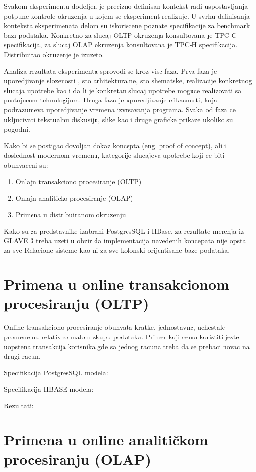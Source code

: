 \documentclass[12pt,oneside]{memoir}
\begin{document}
Svakom eksperimentu dodeljen je precizno definisan kontekst radi uspostavljanja potpune kontrole okruzenja u kojem se eksperiment realizuje. U svrhu definisanja konteksta eksperimenata delom su iskoriscene poznate specifikacije za benchmark bazi podataka. Konkretno za slucaj OLTP okruzenja konsultovana je TPC-C specifikacija, za slucaj OLAP okruzenja konsultovana je TPC-H specifikacija. Distribuirao okruzenje je izuzeto.

Analiza rezultata eksperimenta sprovodi se kroz vise faza. Prva faza je uporedjivanje slozenosti , sto arhitekturalne, sto shematske, realizacije konkretnog slucaja upotrebe kao i da li je konkretan slucaj upotrebe moguce realizovati sa postojecom tehnologijom. Druga faza je uporedjivanje efikasnosti, koja podrazumeva uporedjivanje vremena izvrsavanja programa.  Svaka od faza ce ukljucivati tekstualnu diskusiju, slike kao i druge graficke prikaze ukoliko su pogodni.

Kako bi se postigao dovoljan dokaz koncepta (eng. proof of concept), ali i doslednost modernom
vremenu, kategorije slucajeva upotrebe koji ce biti obuhvaceni su:
\begin{enumerate}
\item Onlajn transakciono procesiranje (OLTP)
\item Onlajn analiticko procesiranje (OLAP)
\item Primena u distribuiranom okruzenju
\end{enumerate}

Kako su za predstavnike izabrani PostgresSQL i HBase,  za rezultate merenja iz GLAVE 3 treba uzeti u obzir da implementacija navedenih koncepata nije opsta za sve Relacione sisteme kao ni za sve kolonski orijentisane baze podataka.
\section{Primena u online transakcionom procesiranju (OLTP)}

Online transakciono procesiranje obuhvata kratke, jednostavne, uchestale promene  na relativno malom skupu podataka. Primer koji cemo koristiti jeste uopstena transakcija korisnika gde sa jednog racuna treba da se prebaci novac na drugi racun.

Specifikacija PostgresSQL modela:

Specifikacija HBASE modela:

Rezultati:

\section{Primena u online analitičkom procesiranju (OLAP)}
\end{document}
